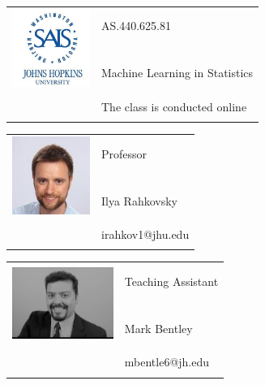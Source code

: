 \documentclass[11pt]{article}
\begin{document}
\begin{tabular}{ l l }
  \multirow{3}{*}{\includegraphics[height=1in,width=1in]{sais-logo.jpg}}  & \LARGE AS.440.625.81 \\\\
  & \LARGE  Machine Learning in Statistics \\\\
  & \LARGE The class is conducted online \\\\
\end{tabular}
\vspace{10mm}


\begin{tabular}{ l l }
  \multirow{3}{*}{\includegraphics[height=1in,width=1in]{ilya_pic.jpg}}  & \large Professor \\\\
  & \large Ilya Rahkovsky \\\\
  & \large irahkov1@jhu.edu \\\\
\end{tabular}
\vspace{10mm}

\begin{tabular}{ l l }
  \multirow{3}{*}{\includegraphics[height=1in,width=1.3in]{LinkedIn_Profile_Pic_3.png}}  & \large Teaching Assistant \\\\
  & \large Mark Bentley \\\\
  & \large mbentle6@jh.edu \\\\
\end{tabular}
\end{document}
